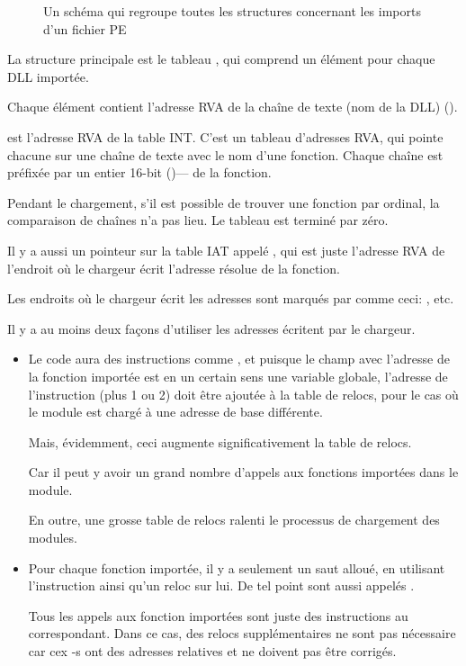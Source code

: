\begin{figure}[H]
\centering
{}
\caption{
Un schéma qui regroupe toutes les structures concernant les imports d'un fichier PE}
\end{figure}

La structure principale est le tableau , qui comprend
un élément pour chaque DLL importée.

Chaque élément contient l'adresse \ac{RVA} de la chaîne de texte (nom de la DLL) ().

 est l'adresse \ac{RVA} de la table \ac{INT}.
C'est un tableau d'adresses \ac{RVA}, qui pointe chacune sur une chaîne de texte
avec le nom d'une fonction.
Chaque chaîne est préfixée par un entier 16-bit ()--- de la fonction.

Pendant le chargement, s'il est possible de trouver une fonction par ordinal, la
comparaison de chaînes n'a pas lieu. Le tableau est terminé par zéro.

Il y a aussi un pointeur sur la table \ac{IAT} appelé , qui est juste
l'adresse \ac{RVA} de l'endroit où le chargeur écrit l'adresse résolue de la fonction.

Les endroits où le chargeur écrit les adresses sont marqués par \IDA comme ceci:
, etc.

Il y a au moins deux façons d'utiliser les adresses écritent par le chargeur.

\begin{itemize}
\item Le code aura des instructions comme , et puisque
le champ avec l'adresse de la fonction importée est en un certain sens une variable
globale, l'adresse de l'instruction  (plus 1 ou 2) doit être ajoutée à la
table de relocs, pour le cas où le module est chargé à une adresse de base différente.

Mais, évidemment, ceci augmente significativement la table de relocs.

Car il peut y avoir un grand nombre d'appels aux fonctions importées dans le module.

En outre, une grosse table de relocs ralenti le processus de chargement des modules.

\item Pour chaque fonction importée, il y a seulement un saut alloué, en utilisant
l'instruction \JMP ainsi qu'un reloc sur lui.
De tel point sont aussi appelés .

Tous les appels aux fonction importées sont juste des instructions \CALL au 
correspondant. Dans ce cas, des relocs supplémentaires ne sont pas nécessaire car
cex \CALL{}-s ont des adresses relatives et ne doivent pas être corrigés.
\end{itemize}

